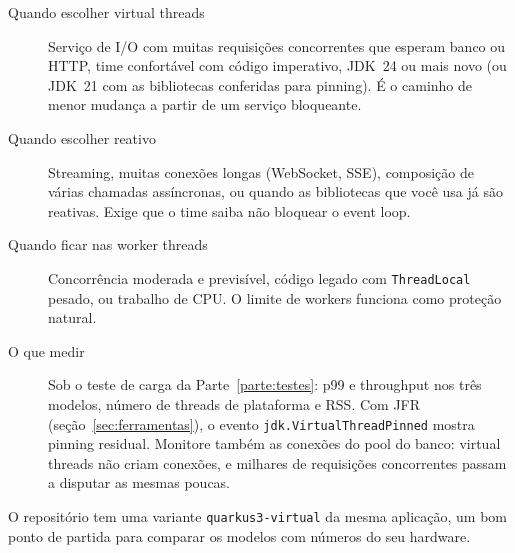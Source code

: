 \begin{description}
\item[Quando escolher virtual threads] Serviço de I/O com muitas
  requisições concorrentes que esperam banco ou HTTP, time confortável
  com código imperativo, JDK~24 ou mais novo (ou JDK~21 com as
  bibliotecas conferidas para pinning). É o caminho de menor mudança a
  partir de um serviço bloqueante.
\item[Quando escolher reativo] Streaming, muitas conexões longas
  (WebSocket, SSE), composição de várias chamadas assíncronas, ou quando
  as bibliotecas que você usa já são reativas. Exige que o time saiba não
  bloquear o event loop.
\item[Quando ficar nas worker threads] Concorrência moderada e
  previsível, código legado com \texttt{ThreadLocal} pesado, ou trabalho
  de CPU. O limite de workers funciona como proteção natural.
\item[O que medir] Sob o teste de carga da Parte~\ref{parte:testes}: p99 e throughput
  nos três modelos, número de threads de plataforma e RSS. Com JFR
  (seção~\ref{sec:ferramentas}), o evento \texttt{jdk.VirtualThreadPinned}
  mostra pinning residual. Monitore também as conexões do pool do banco:
  virtual threads não criam conexões, e milhares de requisições
  concorrentes passam a disputar as mesmas poucas.
\end{description}

O repositório  tem uma variante
\texttt{quarkus3-virtual} da mesma aplicação, um bom ponto de partida
para comparar os modelos com números do seu hardware.

